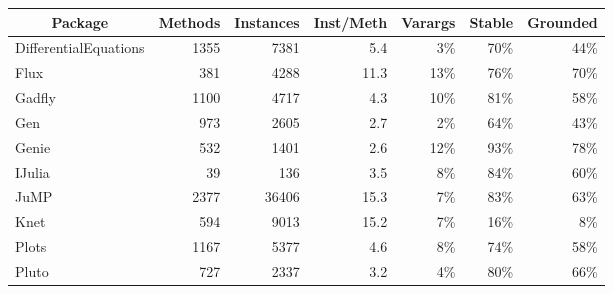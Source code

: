 \begin{tabular}{@{}lrrrrrr@{}}
\toprule
\multicolumn{1}{c}{Package} & \multicolumn{1}{c}{Methods} & \multicolumn{1}{c}{Instances} & \multicolumn{1}{l}{Inst/Meth} & \multicolumn{1}{c}{Varargs} & \multicolumn{1}{c}{Stable} & \multicolumn{1}{c}{Grounded} \\ \midrule
{\footnotesize DifferentialEquations}       & 1355                        & 7381                          & 5.4                           & 3\%                         & 70\%                       & 44\%                         \\
Flux                        & 381                         & 4288                          & 11.3                          & 13\%                        & 76\%                       & 70\%                         \\
Gadfly                      & 1100                        & 4717                          & 4.3                           & 10\%                         & 81\%                       & 58\%                         \\
Gen                         & 973                         & 2605                          & 2.7                           & 2\%                         & 64\%                       & 43\%                         \\
Genie                       & 532                         & 1401                          & 2.6                           & 12\%                        & 93\%                       & 78\%                         \\
IJulia                      & 39                          & 136                           & 3.5                           & 8\%                         & 84\%                       & 60\%                         \\
JuMP                        & 2377                        & 36406                         & 15.3                          & 7\%                        & 83\%                       & 63\%                         \\
Knet                        & 594                         & 9013                          & 15.2                          & 7\%                         & 16\%                       & 8\%                          \\
Plots                       & 1167                        & 5377                          & 4.6                           & 8\%                         & 74\%                       & 58\%                         \\
Pluto                       & 727                         & 2337                          & 3.2                           & 4\%                         & 80\%                       & 66\%                         \\ \bottomrule
\end{tabular}
